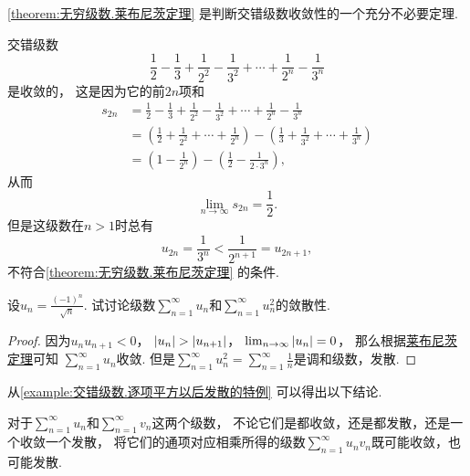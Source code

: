 \cref{theorem:无穷级数.莱布尼茨定理} 是判断交错级数收敛性的一个充分不必要定理.
\begin{example}
交错级数\[
	\frac{1}{2} - \frac{1}{3}
	+ \frac{1}{2^2} - \frac{1}{3^2}
	+ \dotsm + \frac{1}{2^n} - \frac{1}{3^n}
\]是收敛的，
这是因为它的前\(2n\)项和\begin{align*}
	s_{2n} &= \frac{1}{2} - \frac{1}{3}
	+ \frac{1}{2^2} - \frac{1}{3^2}
	+ \dotsm + \frac{1}{2^n} - \frac{1}{3^n} \\
	&= \left(\frac{1}{2} + \frac{1}{2^2} + \dotsm + \frac{1}{2^n}\right)
	- \left(\frac{1}{3} + \frac{1}{3^2} + \dotsm + \frac{1}{3^n}\right) \\
	&= \left(1 - \frac{1}{2^n}\right)
	- \left(\frac{1}{2} - \frac{1}{2\cdot3^n}\right),
\end{align*}
从而\[
	\lim_{n\to\infty} s_{2n} = \frac{1}{2}.
\]
但是这级数在\(n>1\)时总有\[
	u_{2n} = \frac{1}{3^n} < \frac{1}{2^{n+1}} = u_{2n+1},
\]不符合\cref{theorem:无穷级数.莱布尼茨定理} 的条件.
\end{example}

\begin{example}\label{example:交错级数.逐项平方以后发散的特例}
设\(u_n = \frac{(-1)^n}{\sqrt{n}}\).
试讨论级数\(\sum_{n=1}^\infty u_n\)和\(\sum_{n=1}^\infty u_n^2\)的敛散性.
\begin{proof}
因为\(u_n u_{n+1} < 0\)，
\(\abs{u_n} > \abs{u_{n+1}}\)，
\(\lim_{n\to\infty} \abs{u_n} = 0\)，
那么根据\hyperref[theorem:无穷级数.莱布尼茨定理]{莱布尼茨定理}可知
\(\sum_{n=1}^\infty u_n\)收敛.
但是\(\sum_{n=1}^\infty u_n^2
= \sum_{n=1}^\infty \frac{1}{n}\)是调和级数，发散.
\end{proof}
\end{example}

从\cref{example:交错级数.逐项平方以后发散的特例} 可以得出以下结论.
\begin{proposition}
对于\(\sum_{n=1}^\infty u_n\)和\(\sum_{n=1}^\infty v_n\)这两个级数，
不论它们是都收敛，还是都发散，还是一个收敛一个发散，
将它们的通项对应相乘所得的级数\(\sum_{n=1}^\infty u_n v_n\)既可能收敛，也可能发散.
\end{proposition}
